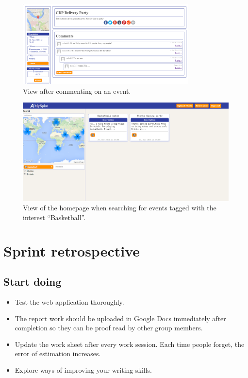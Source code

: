 \begin{figure}[ht!]
  \centering
  \includegraphics[width=90mm]{Sprint5/img/test6.png}
  \caption{View after commenting on an event. }
  \label{fig:S5TestAfterComment}
\end{figure}

\begin{figure}[ht!]
  \centering
  \includegraphics[width=\linewidth]{Sprint5/img/test7.png}
  \caption{View of the homepage when searching for events tagged with the interest ``Basketball''. }
  \label{fig:S5TestAfterComment}
\end{figure}

\newpage
\section{Sprint retrospective}
\label{sec:S5Retrospective}


\subsection{Start doing}
\label{subsec:S5RetrospectiveStart}

\begin{itemize}
  \item Test the web application thoroughly.
  \item The report work should be uploaded in Google Docs immediately after completion so they can be proof read by other group members.
  \item Update the work sheet after every work session. Each time people forget, the error of estimation increases. 
  \item Explore ways of improving your writing skills. 
\end{itemize}

